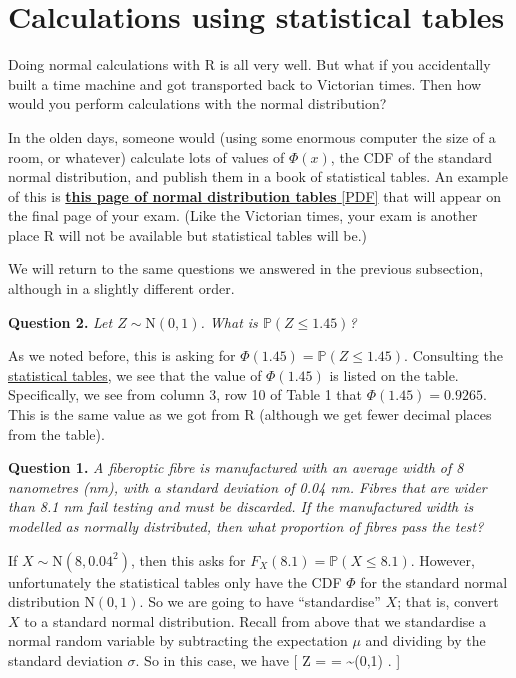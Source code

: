 \documentclass[
  letterpaper,
  DIV=11,
  numbers=noendperiod]{scrreprt}
\theoremstyle{remark}
\begin{document}
\hypertarget{normal-tables}{%
\section{Calculations using statistical tables}\label{normal-tables}}

Doing normal calculations with R is all very well. But what if you
accidentally built a time machine and got transported back to Victorian
times. Then how would you perform calculations with the normal
distribution?

In the olden days, someone would (using some enormous computer the size
of a room, or whatever) calculate lots of values of \(\Phi(x)\), the CDF
of the standard normal distribution, and publish them in a book of
statistical tables. An example of this is
\href{https://mpaldridge.github.io/math1710/stat-tab.pdf}{\textbf{this
page of normal distribution tables} {[}PDF{]}} that will appear on the
final page of your exam. (Like the Victorian times, your exam is another
place R will not be available but statistical tables will be.)

We will return to the same questions we answered in the previous
subsection, although in a slightly different order.

\textbf{Question 2.} \emph{Let \(Z \sim \mathrm{N}(0,1)\). What is
\(\mathbb P(Z \leq 1.45)\)?}

As we noted before, this is asking for
\(\Phi(1.45) = \mathbb P(Z \leq 1.45)\). Consulting the
\href{https://mpaldridge.github.io/math1710/stat-tab.pdf}{statistical
tables}, we see that the value of \(\Phi(1.45)\) is listed on the table.
Specifically, we see from column 3, row 10 of Table 1 that
\(\Phi(1.45) = 0.9265\). This is the same value as we got from R
(although we get fewer decimal places from the table).

\textbf{Question 1.} \emph{A fiberoptic fibre is manufactured with an
average width of 8 nanometres (nm), with a standard deviation of 0.04
nm. Fibres that are wider than 8.1 nm fail testing and must be
discarded. If the manufactured width is modelled as normally
distributed, then what proportion of fibres pass the test?}

If \(X \sim \mathrm{N}(8, 0.04^2)\), then this asks for
\(F_X(8.1) = \mathbb P(X \leq 8.1)\). However, unfortunately the
statistical tables only have the CDF \(\Phi\) for the standard normal
distribution \(\mathrm N(0,1)\). So we are going to have ``standardise''
\(X\); that is, convert \(X\) to a standard normal distribution. Recall
from above that we standardise a normal random variable by subtracting
the expectation \(\mu\) and dividing by the standard deviation
\(\sigma\). So in this case, we have {[} Z =  =
 \sim {}(0,1) . {]}
\end{document}
